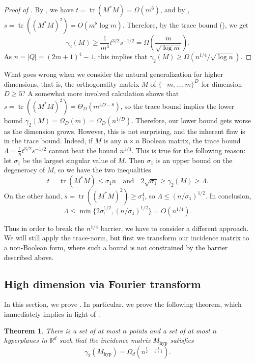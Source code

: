 \documentclass[11pt]{article}
\theoremstyle{plain}
\newtheorem{theorem}{Theorem}[section]
\theoremstyle{definition}
\DeclareMathOperator{\tr}{tr}
\begin{document}
	
	\begin{proof}[Proof of ]
		By , we have $t=\tr(M^*M)=\Omega(m^{6})$, and by , $s=\tr((M^*M)^2)=O(m^8\log m)$. Therefore, by the trace bound (), we get
		$$\gamma_2(M)\geq \frac{1}{m^4} t^{3/2}s^{-1/2}=\Omega\left(\frac{m}{\sqrt{\log m}}\right).$$
		As $n=|Q|=(2m+1)^4-1$, this implies that $\gamma_2(M)\geq \Omega(n^{1/4}/\sqrt{\log n}).$
	\end{proof}
	
	
	What goes wrong when we consider the natural generalization for higher dimensions, that is, the orthogonality matrix $M$ of $\{-m,\dots,m\}^{D}$ for dimension $D\geq 5$? A somewhat more involved calculation shows that $s=\tr((M^*M)^2)=\Theta_D(m^{4D-8})$, so the trace bound implies the lower bound $\gamma_2(M)=\Omega_D(m)=\Omega_D(n^{1/D})$. Therefore, our lower bound gets worse as the dimension grows. However, this is not surprising, and the inherent flaw is in the trace bound. Indeed, if $M$ is any $n\times n$ Boolean matrix, the trace bound $\Lambda=\frac{1}{n}t^{3/2}s^{-1/2}$ cannot beat the bound $n^{1/4}$. This is true for the following reason: let $\sigma_1$ be the largest singular value of $M$. Then $\sigma_1$ is an upper bound on the degeneracy of $M$, so we have the two inequalities $$t=\tr(M^*M)\leq \sigma_1 n\quad\text{and}\quad 2\sqrt{\sigma_1}\geq \gamma_2(M)\geq \Lambda.$$ On the other hand, $s=\tr((M^*M)^2)\geq \sigma_1^4$, so $\Lambda \leq (n/\sigma_1)^{1/2}$. In conclusion, $$\Lambda\leq \min\{2\sigma_1^{1/2},(n/\sigma_1)^{1/2}\}=O(n^{1/4}).$$ 
    
    
    Thus in order to break the $n^{1/4}$ barrier, we have to consider a different approach. We will still apply the trace-norm, but first we transform our incidence matrix to a non-Boolean form, where such a bound is not constrained by the barrier described above.
	
	
	
	\subsection{High dimension via Fourier transform}\label{sect:main_lower}
	
	In this section, we prove . In particular, we prove the following theorem, which immediately implies  in light of .


	
	\begin{theorem}\label{thm:gamma_2_lower}
		There is a set of at most $n$ points and a set of at most $n$ hyperplanes in $\mathbb{R}^d$ such that the incidence matrix $M_{\text{hyp}}$ satisfies
		$$\gamma_2(M_{\text{hyp}})=\Omega_d\left(n^{\frac{1}{2}-\frac{1}{d+1}}\right).$$
	\end{theorem}
	
\end{document}
